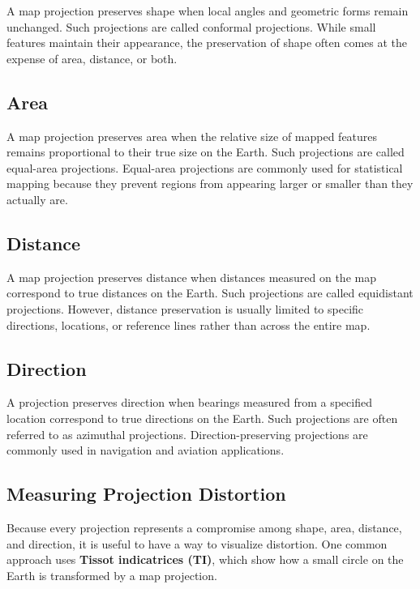 \documentclass[
  letterpaper,
]{book}
\begin{document}
A map projection preserves shape when local angles and geometric forms
remain unchanged. Such projections are called conformal projections.
While small features maintain their appearance, the preservation of
shape often comes at the expense of area, distance, or both.

\subsection{Area}\label{area}

A map projection preserves area when the relative size of mapped
features remains proportional to their true size on the Earth. Such
projections are called equal-area projections. Equal-area projections
are commonly used for statistical mapping because they prevent regions
from appearing larger or smaller than they actually are.

\subsection{Distance}\label{distance}

A map projection preserves distance when distances measured on the map
correspond to true distances on the Earth. Such projections are called
equidistant projections. However, distance preservation is usually
limited to specific directions, locations, or reference lines rather
than across the entire map.

\subsection{Direction}\label{direction}

A projection preserves direction when bearings measured from a specified
location correspond to true directions on the Earth. Such projections
are often referred to as azimuthal projections. Direction-preserving
projections are commonly used in navigation and aviation applications.

\subsection{Measuring Projection
Distortion}\label{measuring-projection-distortion}

Because every projection represents a compromise among shape, area,
distance, and direction, it is useful to have a way to visualize
distortion. One common approach uses \textbf{Tissot indicatrices (TI)},
which show how a small circle on the Earth is transformed by a map
projection.
\end{document}
